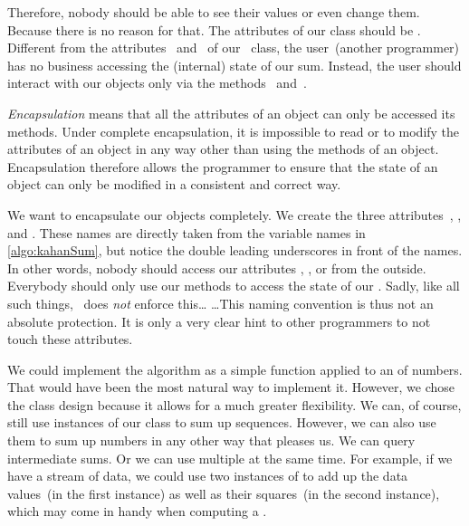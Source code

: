 Therefore, nobody should be able to see their values or even change them.
Because there is no reason for that.
The attributes of our class should be \emph{}.
Different from the attributes~ and~ of our~ class, the user~(another programmer) has no business accessing the (internal) state of our sum.
Instead, the user should interact with our objects only via the methods~ and~.%
%
\begin{definition}[Encapsulation]%
\emph{Encapsulation} means that all the attributes of an object can only be accessed its methods. %
Under complete encapsulation, it is impossible to read or to modify the attributes of an object in any way other than using the methods of an object. %
Encapsulation therefore allows the programmer to ensure that the state of an object can only be modified in a consistent and correct way.%
\end{definition}%
%
We want to encapsulate our objects completely.
We create the three attributes~, , and .
These names are directly taken from the variable names in \cref{algo:kahanSum}, but notice the double leading underscores in front of the names.%
%
%
%
In other words, nobody should access our attributes , , or  from the outside.
Everybody should only use our methods to access the state of our .
Sadly, like all such things, \python\ does \emph{not} enforce this{\dots}
{\dots}This naming convention is thus not an absolute protection.
It is only a very clear hint to other programmers to not touch these attributes.

We could implement the algorithm as a simple function applied to an  of numbers.
That would have been the most natural way to implement it.
However, we chose the class design because it allows for a much greater flexibility.
We can, of course, still use instances of our class to sum up sequences.
However, we can also use them to sum up numbers in any other way that pleases us.
We can query intermediate sums.
Or we can use multiple  at the same time.
For example, if we have a stream of data, we could use two instances of  to add up the data values~(in the first instance) as well as their squares~(in the second instance), which may come in handy when computing a .

